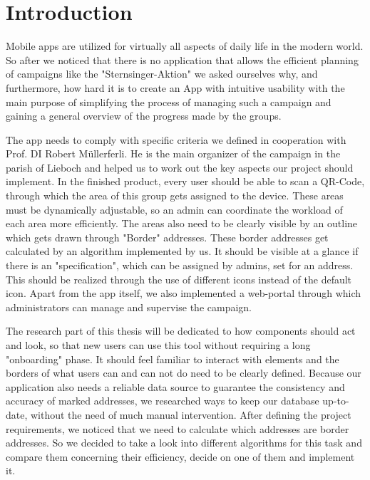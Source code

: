 \section{Introduction}


Mobile apps are utilized for virtually all aspects of daily life in the modern world. So after we noticed that there is no application that allows the efficient planning of campaigns like the "Sternsinger-Aktion" we asked ourselves why, and furthermore, how hard it is to create an App with intuitive usability with the main purpose of simplifying the process of managing such a campaign and gaining a general overview of the progress made by the groups.

\blankLine

The app needs to comply with specific criteria we defined in cooperation with Prof. DI Robert Müllerferli. He is the main organizer of the campaign in the parish of Lieboch and helped us to work out the key aspects our project should implement. In the finished product, every user should be able to scan a QR-Code, through which the area of this group gets assigned to the device. These areas must be dynamically adjustable, so an admin can coordinate the workload of each area more efficiently. The areas also need to be clearly visible by an outline which gets drawn through "Border" addresses. These border addresses get calculated by an algorithm implemented by us. It should be visible at a glance if there is an "specification", which can be assigned by admins, set for an address. This should be realized through the use of different icons instead of the default icon. Apart from the app itself, we also implemented a web-portal through which administrators can manage and supervise the campaign. 


\blankLine

The research part of this thesis will be dedicated to how components should act and look, so that new users can use this tool without requiring a long "onboarding" phase. It should feel familiar to interact with elements and the borders of what users can and can not do need to be clearly defined. Because our application also needs a reliable data source to guarantee the consistency and accuracy of marked addresses, we researched ways to keep our database up-to-date, without the need of much manual intervention. After defining the project requirements, we noticed that we need to calculate which addresses are border addresses. So we decided to take a look into different algorithms for this task and compare them concerning their efficiency, decide on one of them and implement it.

